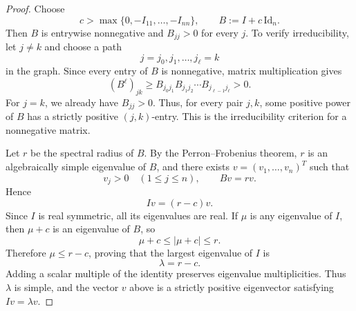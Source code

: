 \documentclass[11pt]{amsart}
\theoremstyle{definition}
\theoremstyle{remark}
\numberwithin{equation}{section}
\begin{document}
\begin{proof}
Choose
\[
  c>\max\{0,-I_{11},\ldots,-I_{nn}\},
  \qquad B:=I+c\,\mathrm{Id}_n.
\]
Then $B$ is entrywise nonnegative and $B_{jj}>0$ for every
$j$. To verify irreducibility, let $j\ne k$ and choose a
path
\[
  j=j_0,j_1,\ldots,j_\ell=k
\]
in the graph. Since every entry of $B$ is nonnegative,
matrix multiplication gives
\[
  (B^\ell)_{jk}
  \ge B_{j_0j_1}B_{j_1j_2}\cdots B_{j_{\ell-1}j_\ell}
  >0.
\]
For $j=k$, we already have $B_{jj}>0$. Thus, for every
pair $j,k$, some positive power of $B$ has a strictly
positive $(j,k)$-entry. This is the irreducibility
criterion for a nonnegative matrix.

Let $r$ be the spectral radius of $B$. By the
Perron--Frobenius theorem, $r$ is an algebraically simple
eigenvalue of $B$, and there exists
$v=(v_1,\ldots,v_n)^T$ such that
\[
  v_j>0\quad(1\le j\le n),
  \qquad Bv=rv.
\]
Hence
\[
  Iv=(r-c)v.
\]
Since $I$ is real symmetric, all its eigenvalues are real.
If $\mu$ is any eigenvalue of $I$, then $\mu+c$ is an
eigenvalue of $B$, so
\[
  \mu+c\le|\mu+c|\le r.
\]
Therefore $\mu\le r-c$, proving that the largest eigenvalue
of $I$ is
\[
  \lambda=r-c.
\]
Adding a scalar multiple of the identity preserves
eigenvalue multiplicities. Thus $\lambda$ is simple,
and the vector $v$ above is a strictly positive
eigenvector satisfying $Iv=\lambda v$.


\end{proof}
\end{document}
